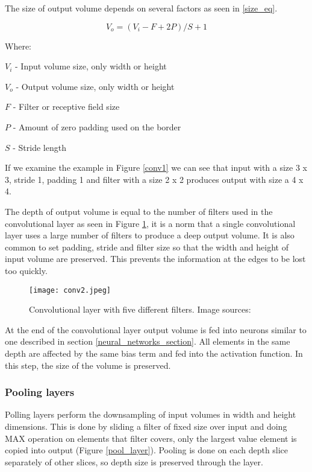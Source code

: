 The size of output volume depends on several factors as seen in \ref{size_eq}.

\begin{equation}\label{size_eq}
V_{o} = (V_{i} - F + 2P) / S + 1
\end{equation}

Where:

$V_{i}$ - Input volume size, only width or height

$V_{o}$ - Output volume size, only width or height

$F$ - Filter or receptive field size

$P$ - Amount of zero padding used on the border

$S$ - Stride length

If we examine the example in Figure \ref{conv1} we can see that input with a size 3 x 3, stride 1, padding 1 and filter with a size 2 x 2 produces output with size a 4 x 4.

The depth of output volume is equal to the number of filters used in the convolutional layer as seen in Figure \ref{conv2}, it is a norm that a single convolutional layer uses a large number of filters to produce a deep output volume\cite{cs231n}.
It is also common to set padding, stride and filter size so that the width and height of input volume are preserved.
This prevents the information at the edges to be lost too quickly\cite{cs231n}.


\begin{figure}[ht] 
    \centering
    \texttt{[image: conv2.jpeg]} 
    \caption{Convolutional layer with five different filters. Image sources: \cite{conv_layer_img}\cite{cs231n}}
    \label{conv2}
\end{figure}

At the end of the convolutional layer output volume is fed into neurons similar to one described in section \ref{neural_networks_section}. 
All elements in the same depth are affected by the same bias term and fed into the activation function.
In this step, the size of the volume is preserved.

\subsubsection{ Pooling layers}

Polling layers perform the downsampling of input volumes in width and height dimensions.
This is done by sliding a filter of fixed size over input and doing MAX operation on elements that filter covers, only the largest value element is copied into output (Figure \ref{pool_layer}).
Pooling is done on each depth slice separately of other slices, so depth size is preserved through the layer.

